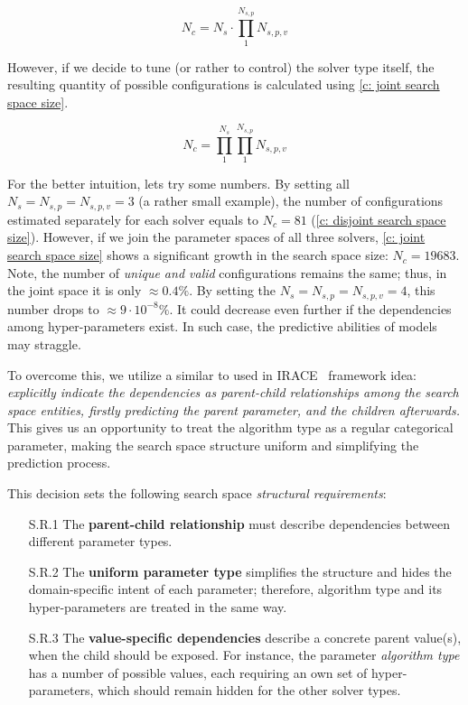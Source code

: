 \begin{equation}
N_c = N_s \cdot \prod_{1}^{N_{s,p}} N_{s,p,v}
\label{c: disjoint search space size}
\end{equation}

However, if we decide to tune (or rather to control) the solver type itself, the resulting quantity of possible configurations is calculated using \cref{c: joint search space size}.

\begin{equation}
N_c = \prod_{1}^{N_{s}} \prod_{1}^{N_{s,p}} N_{s,p,v}
\label{c: joint search space size}
\end{equation}

For the better intuition, lets try some numbers. By setting all $N_s = N_{s,p} = N_{s,p,v} = 3$ (a rather small example), the number of configurations estimated separately for each solver equals to $N_c = 81$ (\cref{c: disjoint search space size}). However, if we join the parameter spaces of all three solvers, \cref{c: joint search space size} shows a significant growth in the search space size: $N_c = 19683$. Note, the number of \emph{unique and valid} configurations remains the same; thus, in the joint space it is only $\approx 0.4\%$. By setting the $N_s = N_{s,p} = N_{s,p,v} = 4$, this number drops to $\approx 9 \cdot 10^{-8}\%$. It could decrease even further if the dependencies among hyper-parameters exist. In such case, the predictive abilities of models may straggle.

To overcome this, we utilize a similar to used in IRACE~\cite{lopez2016irace} framework idea: \emph{explicitly indicate the dependencies as parent-child relationships among the search space entities, firstly predicting the parent parameter, and the children afterwards.} This gives us an opportunity to treat the algorithm type as a regular categorical parameter, making the search space structure uniform and simplifying the prediction process.

This decision sets the following search space \emph{structural requirements}:
\begin{enumerate}
	\item[S.R.1] The \textbf{parent-child relationship} must describe dependencies between different parameter types.

	\item[S.R.2] The \textbf{uniform parameter type} simplifies the structure and hides the domain-specific intent of each parameter; therefore, algorithm type and its hyper-parameters are treated in the same way.

	\item[S.R.3] The \textbf{value-specific dependencies} describe a concrete parent value(s), when the child should be exposed. For instance, the parameter \textit{algorithm type} has a number of possible values, each requiring an own set of hyper-parameters, which should remain hidden for the other solver types.
\end{enumerate}

